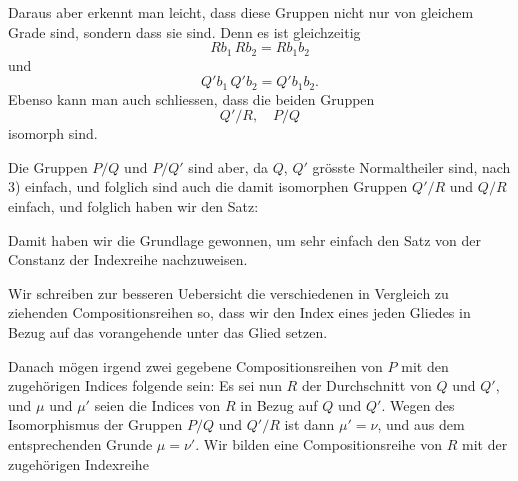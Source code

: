 Daraus aber erkennt man leicht, dass diese Gruppen nicht nur von
gleichem Grade sind, sondern dass sie  sind. Denn es ist
gleichzeitig
\[
Rb_1\,Rb_2 = Rb_1b_2
\]
und
\[
Q'b_1\,Q'b_2 = Q'b_1b_2.
\]
Ebenso kann man auch schliessen, dass die beiden Gruppen
\[
Q'/R,\quad P/Q
\]
isomorph sind.

Die Gruppen $P/Q$ und $P/Q'$ sind aber, da $Q$, $Q'$ grösste
Normaltheiler sind, nach 3) einfach, und folglich sind auch die
damit isomorphen Gruppen $Q'/R$ und $Q/R$ einfach, und folglich
haben wir den Satz:


Damit haben wir die Grundlage gewonnen, um sehr einfach den Satz
von der Constanz der Indexreihe nachzuweisen.

Wir schreiben zur besseren Uebersicht die verschiedenen in
Vergleich zu ziehenden Compositionsreihen so, dass wir den Index
eines jeden Gliedes in Bezug auf das vorangehende unter das Glied
setzen.

Danach mögen irgend zwei gegebene Compositionsreihen von $P$ mit
den zugehörigen Indices folgende sein:
Es sei nun $R$ der Durchschnitt von $Q$ und $Q'$, und $\mu$ und
$\mu'$ seien die Indices von $R$ in Bezug auf $Q$ und $Q'$. Wegen
des Isomorphismus der Gruppen $P/Q$ und $Q'/R$ ist dann $\mu' = \nu$,
und aus dem entsprechenden Grunde $\mu = \nu'$. Wir bilden eine
Compositionsreihe von $R$ mit der zugehörigen Indexreihe

